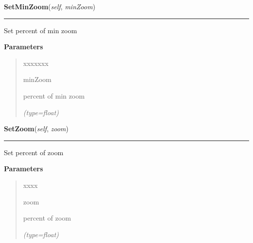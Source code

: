 \hspace{.8\funcindent}\begin{boxedminipage}{\funcwidth}

    \raggedright \textbf{SetMinZoom}(\textit{self}, \textit{minZoom})

    \vspace{-1.5ex}

    \rule{\textwidth}{0.5\fboxrule}
\setlength{\parskip}{2ex}
    Set percent of min zoom

\setlength{\parskip}{1ex}
      \textbf{Parameters}
      \vspace{-1ex}

      \begin{quote}
        \begin{Ventry}{xxxxxxx}

          \item[minZoom]

          percent of min zoom

            {\it (type=float)}

        \end{Ventry}

      \end{quote}

    \end{boxedminipage}

    \label{ImagePanel:ImagePanel:SetZoom}

    \vspace{0.5ex}

\hspace{.8\funcindent}\begin{boxedminipage}{\funcwidth}

    \raggedright \textbf{SetZoom}(\textit{self}, \textit{zoom})

    \vspace{-1.5ex}

    \rule{\textwidth}{0.5\fboxrule}
\setlength{\parskip}{2ex}
    Set percent of zoom

\setlength{\parskip}{1ex}
      \textbf{Parameters}
      \vspace{-1ex}

      \begin{quote}
        \begin{Ventry}{xxxx}

          \item[zoom]

          percent of zoom

            {\it (type=float)}

        \end{Ventry}

      \end{quote}

    \end{boxedminipage}

